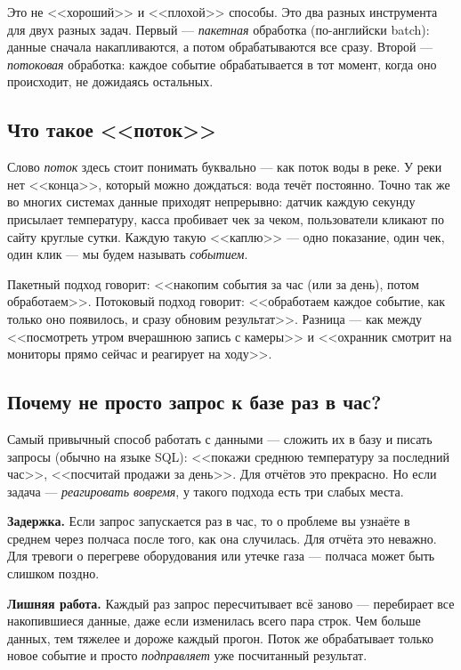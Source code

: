 \documentclass[11pt,a4paper]{article}
\begin{document}
Это не <<хороший>> и <<плохой>> способы. Это два разных инструмента для
двух разных задач. Первый --- \emph{пакетная} обработка (по-английски
batch): данные сначала накапливаются, а потом обрабатываются все сразу.
Второй --- \emph{потоковая} обработка: каждое событие обрабатывается в
тот момент, когда оно происходит, не дожидаясь остальных.

\subsection{Что такое <<поток>>}

Слово \emph{поток} здесь стоит понимать буквально --- как поток воды в
реке. У реки нет <<конца>>, который можно дождаться: вода течёт
постоянно. Точно так же во многих системах данные приходят
непрерывно: датчик каждую секунду присылает температуру, касса
пробивает чек за чеком, пользователи кликают по сайту круглые сутки.
Каждую такую <<каплю>> --- одно показание, один чек, один клик --- мы
будем называть \emph{событием}.

Пакетный подход говорит: <<накопим события за час (или за день), потом
обработаем>>. Потоковый подход говорит: <<обработаем каждое событие, как
только оно появилось, и сразу обновим результат>>. Разница --- как
между <<посмотреть утром вчерашнюю запись с камеры>> и <<охранник
смотрит на мониторы прямо сейчас и реагирует на ходу>>.

\subsection{Почему не просто запрос к базе раз в час?}

Самый привычный способ работать с данными --- сложить их в базу и
писать запросы (обычно на языке SQL): <<покажи среднюю температуру за
последний час>>, <<посчитай продажи за день>>. Для отчётов это
прекрасно. Но если задача --- \emph{реагировать вовремя}, у такого
подхода есть три слабых места.

\textbf{Задержка.} Если запрос запускается раз в час, то о проблеме вы
узнаёте в среднем через полчаса после того, как она случилась. Для
отчёта это неважно. Для тревоги о перегреве оборудования или утечке
газа --- полчаса может быть слишком поздно.

\textbf{Лишняя работа.} Каждый раз запрос пересчитывает всё заново ---
перебирает все накопившиеся данные, даже если изменилась всего пара
строк. Чем больше данных, тем тяжелее и дороже каждый прогон. Поток же
обрабатывает только новое событие и просто \emph{подправляет} уже
посчитанный результат.
\end{document}
